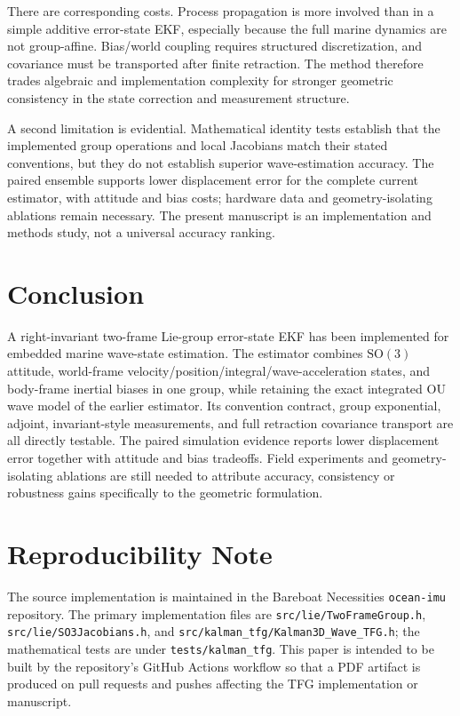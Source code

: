 \documentclass[conference]{IEEEtran}
\newcommand{\SO}{\mathrm{SO}}
\theoremstyle{bodysmall}
\begin{document}
There are corresponding costs. Process propagation is more involved than in a simple additive error-state EKF, especially because the full marine dynamics are not group-affine. Bias/world coupling requires structured discretization, and covariance must be transported after finite retraction. The method therefore trades algebraic and implementation complexity for stronger geometric consistency in the state correction and measurement structure.

A second limitation is evidential. Mathematical identity tests establish that the implemented group operations and local Jacobians match their stated conventions, but they do not establish superior wave-estimation accuracy. The paired ensemble supports lower displacement error for the complete current estimator, with attitude and bias costs; hardware data and geometry-isolating ablations remain necessary. The present manuscript is an implementation and methods study, not a universal accuracy ranking.

\section{Conclusion}
A right-invariant two-frame Lie-group error-state EKF has been implemented for embedded marine wave-state estimation. The estimator combines $\SO(3)$ attitude, world-frame velocity/position/integral/wave-acceleration states, and body-frame inertial biases in one group, while retaining the exact integrated OU wave model of the earlier estimator. Its convention contract, group exponential, adjoint, invariant-style measurements, and full retraction covariance transport are all directly testable. The paired simulation evidence reports lower displacement error together with attitude and bias tradeoffs. Field experiments and geometry-isolating ablations are still needed to attribute accuracy, consistency or robustness gains specifically to the geometric formulation.

\section*{Reproducibility Note}
The source implementation is maintained in the Bareboat Necessities \texttt{ocean-imu} repository. The primary implementation files are \texttt{src/lie/TwoFrameGroup.h}, \texttt{src/lie/SO3Jacobians.h}, and \texttt{src/kalman\_tfg/Kalman3D\_Wave\_TFG.h}; the mathematical tests are under \texttt{tests/kalman\_tfg}. This paper is intended to be built by the repository's GitHub Actions workflow so that a PDF artifact is produced on pull requests and pushes affecting the TFG implementation or manuscript.
\end{document}
